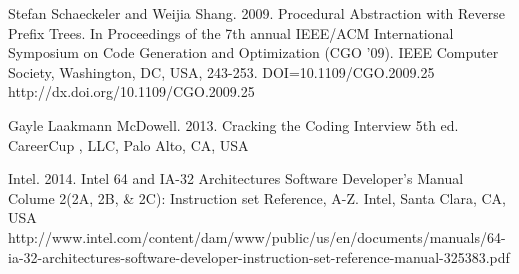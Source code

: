 \documentclass[9pt,nocopyrightspace]{sigplanconf}
\begin{document}
\begin{thebibliography}{}
\softraggedright

Stefan Schaeckeler and Weijia Shang. 2009. Procedural Abstraction with Reverse Prefix Trees. In Proceedings of the 7th annual IEEE/ACM International Symposium on Code Generation and Optimization (CGO '09). IEEE Computer Society, Washington, DC, USA, 243-253. DOI=10.1109/CGO.2009.25 http://dx.doi.org/10.1109/CGO.2009.25

Gayle Laakmann McDowell. 2013. Cracking the Coding Interview 5th ed. CareerCup , LLC, Palo Alto, CA, USA

Intel. 2014. Intel 64 and IA-32 Architectures Software Developer's Manual Colume 2(2A, 2B, \& 2C): Instruction set Reference, A-Z. Intel, Santa Clara, CA, USA http://www.intel.com/content/dam/www/public/us/en/documents/manuals/64-ia-32-architectures-software-developer-instruction-set-reference-manual-325383.pdf

\end{thebibliography}
\end{document}
